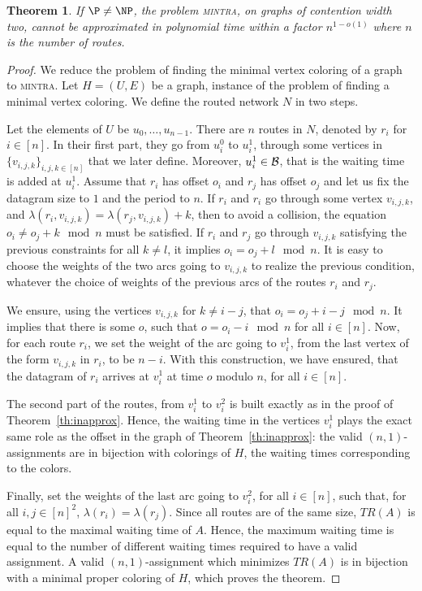 \documentclass[a4paper,10pt]{journal}
\newtheorem{theorem}{Theorem}
\newcommand\mintra{\textsc{mintra}\xspace}
\begin{document}
\begin{theorem}
If $\P \neq \NP$, the problem \mintra, on graphs of contention width two, cannot be approximated in polynomial time within a factor $n^{1-o(1)}$ where $n$ is the number of routes.
\end{theorem}

\begin{proof}
We reduce the problem of finding the minimal vertex coloring of a graph to \mintra.
 Let $H = (U,E)$ be a graph, instance of the problem of finding a minimal vertex coloring. 
 We define the routed network $N$ in two steps. 

 Let the elements of $U$ be $u_0,\dots, u_{n-1}$. There are $n$ routes in $N$, denoted by $r_i$ for $i \in [n]$. In their first part, they go from $u_i^0$ to $u_i^1$, through some vertices in $\{v_{i,j,k}\}_{i,j,k \in [n]}$ that we later define. Moreover, $u_i^1 \in \cal{B}$, that is the waiting time is added at $u_i^1$. Assume that $r_i$ has offset $o_i$ and $r_j$ has offset $o_j$ and let us fix the datagram size to $1$ and the period to $n$. If $r_i$ and $r_i$ go through some vertex $v_{i,j,k}$, and  $\lambda(r_i,v_{i,j,k}) = \lambda(r_j,v_{i,j,k}) + k$, then to avoid a collision, the equation $o_i \neq o_j + k \mod n$ must be satisfied. If $r_i$ and $r_j$ go through $v_{i,j,k}$ satisfying the previous constraints for all $k \neq l$, it implies $o_i = o_j + l \mod n$. 
 It is easy to choose the weights of the two arcs going to $v_{i,j,k}$ to realize the previous condition, whatever the choice of weights of the previous arcs of the routes $r_i$ and $r_j$.

We ensure, using the vertices $v_{i,j,k}$ for $k \neq i-j$,
that $o_{i} = o_{j} + i - j \mod n$. It implies that there is some $o$, such that 
$ o = o_{i} - i \mod n$ for all $i \in [n]$. Now, for each route $r_i$, we set the weight of the
arc going to $v_i^1$, from the last vertex of the form $v_{i,j,k}$ in $r_i$, to be $n-i$.
With this construction, we have ensured, that the datagram of $r_i$ arrives at 
$v_i^1$ at time $o$ modulo $n$, for all $i \in [n]$. 

The second part of the routes, from $v_i^1$ to $v_i^2$ is built exactly as in the proof of Theorem~\ref{th:inapprox}. Hence, the waiting time in the vertices $v_i^1$ plays the exact same role as the offset
in the graph of Theorem~\ref{th:inapprox}: the valid $(n,1)$-assignments are in bijection with colorings of $H$, the waiting times corresponding to the colors.

Finally, set the weights of the last arc going to $v_i^2$, for all $i \in [n]$, such that, for all $i,j \in [n]^2$, $\lambda(r_i) = \lambda(r_j)$.  Since all routes are of the same size, $TR(A)$ is equal to the maximal waiting time of $A$. Hence, the maximum waiting time is equal to the number of different waiting times required to have a valid assignment. A valid $(n,1)$-assignment which minimizes $TR(A)$ is in bijection with a minimal proper coloring of $H$, which proves the theorem.
\end{proof}
\end{document}
